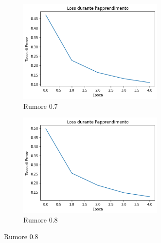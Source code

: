 \documentclass[12pt, a4paper]{article}
\begin{document}
\begin{figure}[H]
    \begin{subfigure}{0.5\textwidth}
        \centering
        \caption{Rumore 0.7}
        \includegraphics[width=0.80\textwidth]{Rumore7.png}
    \end{subfigure}    
    \begin{subfigure}{0.5\textwidth}
        \centering
        \caption{Rumore 0.8}
        \includegraphics[width=0.80\textwidth]{Rumore8.png}
    \end{subfigure}  
\end{figure}
\end{document}
